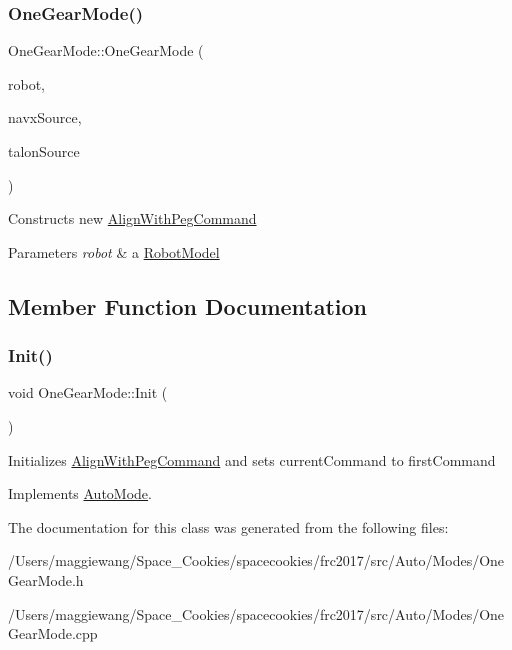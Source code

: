 \subsubsection{\texorpdfstring{One\+Gear\+Mode()}{OneGearMode()}}
{\footnotesize\ttfamily One\+Gear\+Mode\+::\+One\+Gear\+Mode (\begin{DoxyParamCaption}\item[{\hyperlink{class_robot_model}{Robot\+Model} $\ast$}]{robot,  }\item[{\hyperlink{class_navx_p_i_d_source}{Navx\+P\+I\+D\+Source} $\ast$}]{navx\+Source,  }\item[{\hyperlink{class_talon_encoder_p_i_d_source}{Talon\+Encoder\+P\+I\+D\+Source} $\ast$}]{talon\+Source }\end{DoxyParamCaption})}

Constructs new \hyperlink{class_align_with_peg_command}{Align\+With\+Peg\+Command} 
\begin{DoxyParams}{Parameters}
{\em robot} & a \hyperlink{class_robot_model}{Robot\+Model} \\
\hline
\end{DoxyParams}


\subsection{Member Function Documentation}
\mbox{\label{class_one_gear_mode_a6e4583155a7f2c96f19e937d1315bdf8}} 
\subsubsection{\texorpdfstring{Init()}{Init()}}
{\footnotesize\ttfamily void One\+Gear\+Mode\+::\+Init (\begin{DoxyParamCaption}{ }\end{DoxyParamCaption})\hspace{0.3cm}{\ttfamily [virtual]}}

Initializes \hyperlink{class_align_with_peg_command}{Align\+With\+Peg\+Command} and sets current\+Command to first\+Command 

Implements \hyperlink{class_auto_mode}{Auto\+Mode}.



The documentation for this class was generated from the following files\+:\begin{DoxyCompactItemize}
\item 
/\+Users/maggiewang/\+Space\+\_\+\+Cookies/spacecookies/frc2017/src/\+Auto/\+Modes/One\+Gear\+Mode.\+h\item 
/\+Users/maggiewang/\+Space\+\_\+\+Cookies/spacecookies/frc2017/src/\+Auto/\+Modes/One\+Gear\+Mode.\+cpp\end{DoxyCompactItemize}
